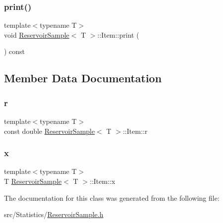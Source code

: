 \subsubsection{\texorpdfstring{print()}{print()}}
{\footnotesize\ttfamily template$<$typename T$>$ \\
void \hyperlink{class_reservoir_sample}{Reservoir\+Sample}$<$ T $>$\+::Item\+::print (\begin{DoxyParamCaption}{ }\end{DoxyParamCaption}) const\hspace{0.3cm}{\ttfamily [inline]}}



\subsection{Member Data Documentation}
\mbox{\label{class_reservoir_sample_1_1_item_ad74b6fb33eb3a534eeb4141c735dfaf5}} 
\subsubsection{\texorpdfstring{r}{r}}
{\footnotesize\ttfamily template$<$typename T$>$ \\
const double \hyperlink{class_reservoir_sample}{Reservoir\+Sample}$<$ T $>$\+::Item\+::r}

\mbox{\label{class_reservoir_sample_1_1_item_abc1ea374480d6d86d0466e4683c98337}} 
\subsubsection{\texorpdfstring{x}{x}}
{\footnotesize\ttfamily template$<$typename T$>$ \\
T \hyperlink{class_reservoir_sample}{Reservoir\+Sample}$<$ T $>$\+::Item\+::x}



The documentation for this class was generated from the following file\+:\begin{DoxyCompactItemize}
\item 
src/\+Statistics/\hyperlink{_reservoir_sample_8h}{Reservoir\+Sample.\+h}\end{DoxyCompactItemize}

